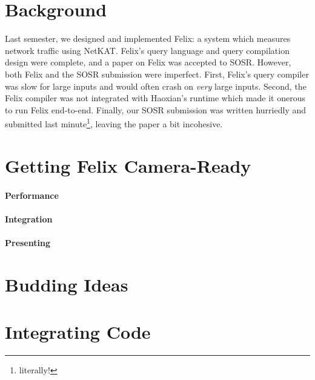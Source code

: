 \section{Background}
Last semester, we designed and implemented Felix: a system which measures
network traffic using NetKAT. Felix's query language and query compilation
design were complete, and a paper on Felix was accepted to SOSR. However,
both Felix and the SOSR submission were imperfect. First, Felix's query
compiler was slow for large inputs and would often crash on \emph{very} large
inputs. Second, the Felix compiler was not integrated with Haoxian's runtime
which made it onerous to run Felix end-to-end. Finally, our SOSR submission was
written hurriedly and submitted last minute\footnote{literally!}, leaving the
paper a bit incohesive.

\section{Getting Felix Camera-Ready}
\paragraph{Performance}

\paragraph{Integration}

\paragraph{Presenting}

\section{Budding Ideas}

\section{Integrating Code}
